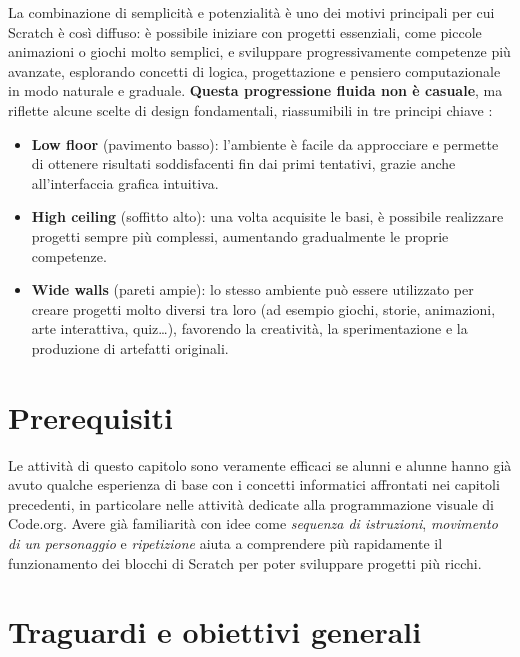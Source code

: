 La combinazione di semplicità e potenzialità è uno dei motivi principali per cui Scratch è così diffuso: è possibile iniziare con progetti essenziali, come piccole animazioni o giochi molto semplici, e sviluppare progressivamente competenze più avanzate, esplorando concetti di logica, progettazione e pensiero computazionale in modo naturale e graduale. \textbf{Questa progressione fluida non è casuale}, ma riflette alcune scelte di design fondamentali, riassumibili in tre principi chiave \parencite{resnick-2018}:

\begin{itemize}
\item
  \textbf{Low floor} (pavimento basso): l'ambiente è facile da approcciare e permette di ottenere risultati soddisfacenti fin dai primi tentativi, grazie anche all'interfaccia grafica intuitiva.
\item
  \textbf{High ceiling} (soffitto alto): una volta acquisite le basi, è possibile realizzare progetti sempre più complessi, aumentando gradualmente le proprie competenze.
\item
  \textbf{Wide walls} (pareti ampie): lo stesso ambiente può essere utilizzato per creare progetti molto diversi tra loro (ad esempio giochi, storie, animazioni, arte interattiva, quiz\ldots), favorendo la creatività, la sperimentazione e la produzione di artefatti originali.
\end{itemize}

\section{Prerequisiti }\label{prerequisiti-5}

Le attività di questo capitolo sono veramente efficaci se alunni e alunne hanno già avuto qualche esperienza di base con i concetti informatici affrontati nei capitoli precedenti, in particolare nelle attività dedicate alla programmazione visuale di Code.org. Avere già familiarità con idee come \emph{sequenza di istruzioni}, \emph{movimento di un personaggio} e \emph{ripetizione} aiuta a comprendere più rapidamente il funzionamento dei blocchi di Scratch per poter sviluppare progetti più ricchi.

\section{Traguardi e obiettivi generali }\label{traguardi-e-obiettivi-generali-5}

